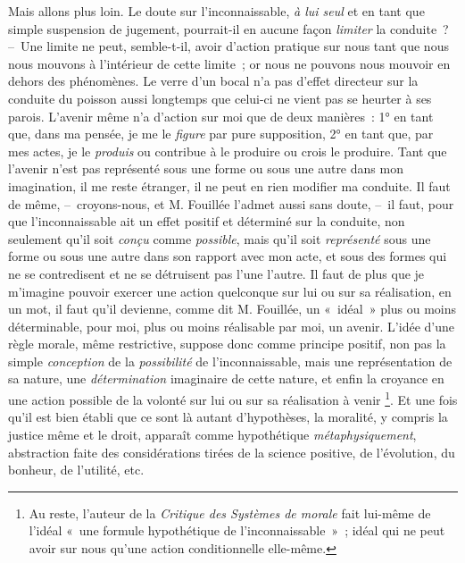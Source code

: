 \documentclass[french,twoside]{book} %
\begin{document}
Mais allons plus loin. Le doute sur l’inconnaissable, \emph{à lui seul} et en tant que simple suspension de jugement, pourrait-il en aucune façon \emph{limiter} la conduite ? – Une limite ne peut, semble-t-il, avoir d’action pratique sur nous tant que nous nous mouvons à l’intérieur de cette limite ; or nous ne pouvons nous mouvoir en dehors des phénomènes. Le verre d’un bocal n’a pas d’effet directeur sur la conduite du poisson aussi longtemps que celui-ci ne vient pas se heurter à ses parois. L’avenir même n’a d’action sur moi que de deux manières : 1° en tant que, dans ma pensée, je me le \emph{figure} par pure supposition, 2° en tant que, par mes actes, je le \emph{produis} ou contribue à le produire ou crois le produire. Tant que l’avenir n’est pas représenté sous une forme ou sous une autre dans mon imagination, il me reste étranger, il ne peut en rien modifier ma conduite. Il faut de même, – croyons-nous, et M. Fouillée l’admet aussi sans doute, – il faut, pour que l’inconnaissable ait un effet positif et déterminé sur la conduite, non seulement qu’il soit \emph{conçu} comme \emph{possible}, mais qu’il soit \emph{représenté} sous une forme ou sous une autre dans son rapport avec mon acte, et sous des formes qui ne se contredisent et ne se détruisent pas l’une l’autre. Il faut de plus que je m’imagine pouvoir exercer une action quelconque sur lui ou sur sa réalisation, en un mot, il faut qu’il devienne, comme dit M. Fouillée, un « idéal » plus ou moins déterminable, pour moi, plus ou moins réalisable par moi, un avenir. L’idée d’une règle morale, même restrictive, suppose donc comme principe positif, non pas la simple \emph{conception} de la \emph{possibilité} de l’inconnaissable, mais une représentation de sa nature, une \emph{détermination} imaginaire de cette nature, et enfin la croyance en une action possible de la volonté sur lui ou sur sa réalisation à venir \footnote{Au reste, l’auteur de la \emph{Critique des Systèmes de morale} fait lui-même de l’idéal « une formule hypothétique de l’inconnaissable » ; idéal qui ne peut avoir sur nous qu’une action conditionnelle elle-même.}. Et une fois qu’il est bien établi que ce sont là autant d’hypothèses, la moralité, y compris la justice même et le droit, apparaît comme hypothétique \emph{métaphysiquement}, abstraction faite des considérations tirées de la science positive, de l’évolution, du bonheur, de l’utilité, etc.\par
\end{document}

